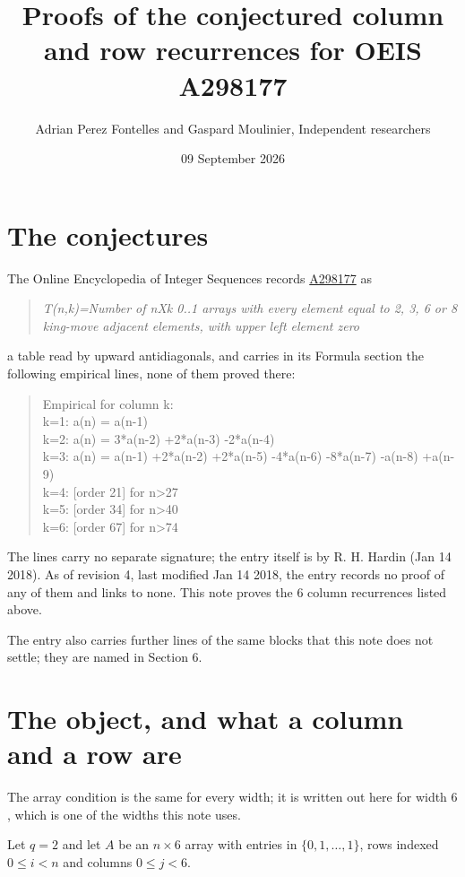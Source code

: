 \documentclass[11pt]{article}
\title{Proofs of the conjectured column and row recurrences for OEIS A298177}
\author{Adrian Perez Fontelles and Gaspard Moulinier, Independent researchers}
\date{09 September 2026}
\theoremstyle{definition}
\begin{document}
\maketitle
\section{The conjectures}

The Online Encyclopedia of Integer Sequences records \href{https://oeis.org/A298177}{A298177} as

\begin{quote}\itshape T(n,k)=Number of nXk 0..1 arrays with every element equal to 2, 3, 6 or 8 king-move adjacent elements, with upper left element zero\end{quote}

a table read by upward antidiagonals, and carries in its Formula section the following empirical lines, none of them proved there:

\begin{quote}\ttfamily Empirical for column k:\\
k=1: a(n) = a(n-1)\\k=2: a(n) = 3*a(n-2) +2*a(n-3) -2*a(n-4)\\k=3: a(n) = a(n-1) +2*a(n-2) +2*a(n-5) -4*a(n-6) -8*a(n-7) -a(n-8) +a(n-9)\\k=4: [order 21] for n>27\\k=5: [order 34] for n>40\\k=6: [order 67] for n>74\end{quote}

The lines carry no separate signature; the entry itself is by R. H. Hardin (Jan 14 2018). As of revision 4, last modified Jan 14 2018, the entry records no proof of any of them and links to none. This note proves the 6 column recurrences listed above.

The entry also carries further lines of the same blocks that this note does not settle; they are named in Section 6.

\section{The object, and what a column and a row are}

The array condition is the same for every width; it is written out here for width $6$, which is one of the widths this note uses.

Let $q = 2$ and let $A$ be an $n \times 6$ array with entries in $\{0,1,\dots,1\}$, rows indexed $0 \le i < n$ and columns $0 \le j < 6$.
\end{document}
